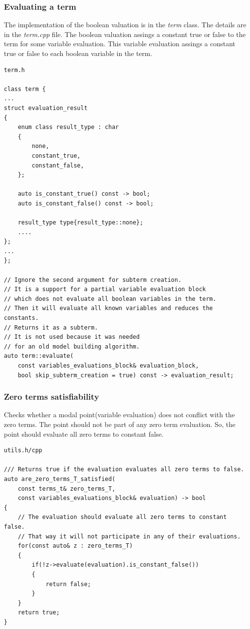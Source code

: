 \documentclass{article}
\begin{document}
	\newpage
	\subsubsection*{Evaluating a term}
	The implementation of the boolean valuation is in the \textit{term} class. The details are in the \textit{term.cpp} file.
	The boolean valuation assings a constant true or false to the term for some variable evaluation. This variable evaluation assings a constant true or false to each boolean variable in the term.
\\
\begin{lstlisting}
term.h

class term {
...
struct evaluation_result
{
    enum class result_type : char
    {
        none,
        constant_true,
        constant_false,
    };

    auto is_constant_true() const -> bool;
    auto is_constant_false() const -> bool;

    result_type type{result_type::none};
	....
};
...
};

// Ignore the second argument for subterm creation.
// It is a support for a partial variable evaluation block
// which does not evaluate all boolean variables in the term.
// Then it will evaluate all known variables and reduces the constants.
// Returns it as a subterm.
// It is not used because it was needed
// for an old model building algorithm.
auto term::evaluate(
	const variables_evaluations_block& evaluation_block,
	bool skip_subterm_creation = true) const -> evaluation_result;
\end{lstlisting}

	\newpage
	\subsubsection*{Zero terms satisfiability}
	Checks whether a modal point(variable evaluation) does not conflict with the zero terms. The point should not be part of any zero term evaluation. So, the point should evaluate all zero terms to constant false.
\\
\begin{lstlisting}
utils.h/cpp

/// Returns true if the evaluation evaluates all zero terms to false.
auto are_zero_terms_T_satisfied(
	const terms_t& zero_terms_T,
	const variables_evaluations_block& evaluation) -> bool
{
    // The evaluation should evaluate all zero terms to constant false.
    // That way it will not participate in any of their evaluations.
    for(const auto& z : zero_terms_T)
    {
        if(!z->evaluate(evaluation).is_constant_false())
        {
            return false;
        }
    }
    return true;
}
\end{lstlisting}
\end{document}
